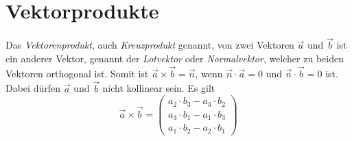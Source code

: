 \documentclass{article}
\begin{document}
  
\newcommand{\norm}[1]{\big| {#1} \big|}  
\newcommand{\vect}[1]{\overrightarrow{#1}} 
 
\section{Vektorprodukte} 
\begin{minipage}{\dimexpr\textwidth-4cm} 
Das \emph{Vektorenprodukt}, auch \emph{Kreuzprodukt} genannt, von zwei Vektoren $\vect{a}$ und $\vect{b}$ ist ein anderer Vektor, genannt der \emph{Lotvektor} oder \emph{Normalvektor}, welcher zu beiden Vektoren orthogonal ist. Somit ist $\vect{a} \times \vect{b} = \vect{n}$, wenn $\vect{n} \cdot \vect{a} = 0$ und $\vect{n} \cdot \vect{b} = 0$ ist. Dabei dürfen $\vect{a}$ und $\vect{b}$ nicht kollinear sein. \newline
Es gilt 
\[
 \vect{a} \times \vect{b} =
 \begin{pmatrix}
  a_2 \cdot b_3 - a_3 \cdot b_2 \\
  a_3 \cdot b_1 - a_1 \cdot b_3 \\
  a_1 \cdot b_2 - a_2 \cdot b_1 
 \end{pmatrix}
\]
\end{minipage} 
\hfill
\begin{minipage}{4cm}
 \centering 
\end{minipage} 
  
\end{document}

